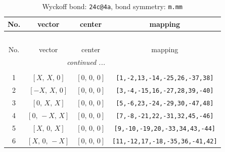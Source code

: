 \documentclass[fleqn,8pt]{jsarticle}
\begin{document}
\begin{longtable}{cccc}
\caption{Wyckoff bond: {\tt 24c@4a}, bond symmetry: {\tt m.mm}}
 \\
 \hline \hline
No. & vector & center & mapping \\ \hline \endfirsthead

\multicolumn{3}{l}{\tablename\ \thetable{}} \\
 \hline \hline
No. & vector & center & mapping \\ \hline \endhead

 \hline \hline
\multicolumn{3}{r}{\footnotesize\it continued ...} \\ \endfoot

 \hline \hline
\multicolumn{3}{r}{} \\ \endlastfoot

1 & $\left[ X,\, X,\, 0 \right]$ & $\left[ 0,\, 0,\, 0 \right]$ & {\tt [1,-2,13,-14,-25,26,-37,38]} \\ \hline
2 & $\left[ - X,\, X,\, 0 \right]$ & $\left[ 0,\, 0,\, 0 \right]$ & {\tt [3,-4,-15,16,-27,28,39,-40]} \\ \hline
3 & $\left[ 0,\, X,\, X \right]$ & $\left[ 0,\, 0,\, 0 \right]$ & {\tt [5,-6,23,-24,-29,30,-47,48]} \\ \hline
4 & $\left[ 0,\, - X,\, X \right]$ & $\left[ 0,\, 0,\, 0 \right]$ & {\tt [7,-8,-21,22,-31,32,45,-46]} \\ \hline
5 & $\left[ X,\, 0,\, X \right]$ & $\left[ 0,\, 0,\, 0 \right]$ & {\tt [9,-10,-19,20,-33,34,43,-44]} \\ \hline
6 & $\left[ X,\, 0,\, - X \right]$ & $\left[ 0,\, 0,\, 0 \right]$ & {\tt [11,-12,17,-18,-35,36,-41,42]} \\
\end{longtable}
\renewcommand{\arraystretch}{1.2}
\end{document}
